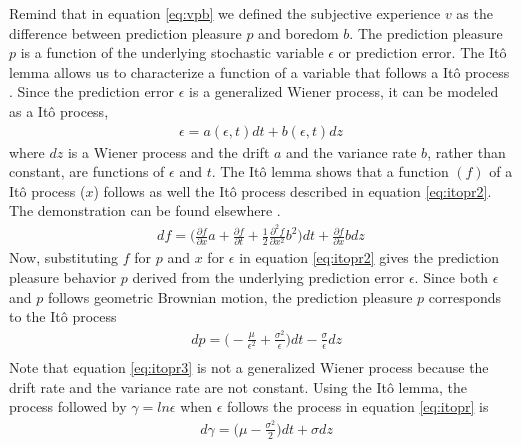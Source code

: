 \documentclass[11pt, onecolumn]{article}
\begin{document}
Remind that in equation \ref{eq:vpb} we defined the subjective experience $v$ as the difference between prediction pleasure $p$ and boredom $b$. The prediction pleasure $p$ is a function of the underlying stochastic variable $\epsilon$ or prediction error. The It\^{o} lemma allows us to characterize a function of a variable that follows a It\^{o} process \citep{ito_stochastic_1951}. Since the prediction error $\epsilon$ is a generalized Wiener process, it can be modeled as a It\^{o} process, 
\begin{equation*}
\begin{split}
   \epsilon = a(\epsilon,t)dt + b(\epsilon,t)dz
\end{split}
\label{eq:itopr}
\end{equation*}
where $dz$ is a Wiener process and the drift $a$ and the variance rate $b$, rather than constant, are functions of $\epsilon$ and $t$. The It\^{o} lemma shows that a function $(f)$ of a It\^{o} process ($x$) follows as well the It\^{o} process described in equation \ref{eq:itopr2}. The demonstration can be found elsewhere \citep{shreve_stochastic_2010}. 
\begin{equation}
\begin{split}
   df = \bigg(\frac{\partial f}{\partial x} a  + \frac{\partial f}{\partial t} + \frac{1}{2}\frac{\partial ^2 f}{\partial x^2} b^2 \bigg)dt + \frac{\partial f}{\partial x}b dz
\end{split}
\label{eq:itopr2}
\end{equation}
Now, substituting $f$ for $p$ and $x$ for $\epsilon$ in equation \ref{eq:itopr2} gives the prediction pleasure behavior $p$ derived from the underlying prediction error $\epsilon$. Since both $\epsilon$ and $p$ follows geometric Brownian motion, the prediction pleasure $p$ corresponds to the It\^{o} process  
\begin{equation}
\begin{split}
 & dp =  \big(- \frac{\mu}{\epsilon^2} + \frac{\sigma^2}{\epsilon}\big)dt - \frac{\sigma}{\epsilon}dz \\
\end{split}
\label{eq:itopr3}
\end{equation}
Note that equation \ref{eq:itopr3} is not a generalized Wiener process because the drift rate and the variance rate are not constant.
Using the It\^{o} lemma, the process followed by $\gamma = ln \epsilon$ when $\epsilon$ follows the process in equation \ref{eq:itopr} is
\begin{equation}
\begin{split}
&  d \gamma =  \bigg( \mu - \frac{\sigma^2}{2} \bigg)dt + \sigma dz \\
\end{split}
\label{eq:itoprex}
\end{equation}
\end{document}
